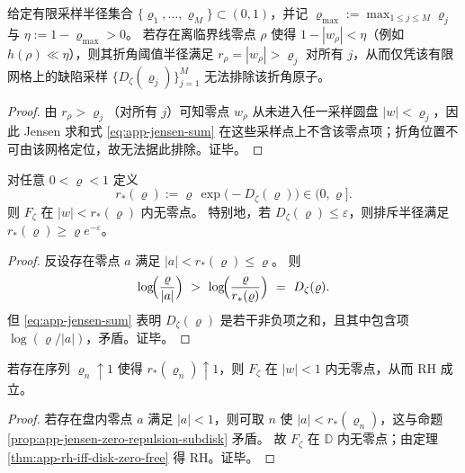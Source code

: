 \begin{corollary}[采样半径截断下的不可检出边界层]\label{cor:app-jensen-kink-undetectable-threshold}
给定有限采样半径集合 \(\{\varrho_1,\dots,\varrho_M\}\subset(0,1)\)，并记
\(
\varrho_{\max}:=\max_{1\le j\le M}\varrho_j
\)
与 \(\eta:=1-\varrho_{\max}>0\)。
若存在离临界线零点 \(\rho\) 使得 \(1-|w_{\rho}|<\eta\)（例如 \(h(\rho)\ll \eta\)），则其折角阈值半径满足 \(r_{\rho}=|w_{\rho}|>\varrho_j\) 对所有 \(j\)，从而仅凭该有限网格上的缺陷采样 \(\{D_{\zeta}(\varrho_j)\}_{j=1}^{M}\) 无法排除该折角原子。
\end{corollary}
\begin{proof}
由 \(r_{\rho}>\varrho_j\)（对所有 \(j\)）可知零点 \(w_{\rho}\) 从未进入任一采样圆盘 \(|w|<\varrho_j\)，因此 Jensen 求和式 \eqref{eq:app-jensen-sum} 在这些采样点上不含该零点项；折角位置不可由该网格定位，故无法据此排除。证毕。
\end{proof}

\begin{proposition}[由缺陷导出的零点排斥子盘]\label{prop:app-jensen-zero-repulsion-subdisk}
对任意 \(0<\varrho<1\) 定义
\[
r_{\ast}(\varrho):=\varrho\,\exp\!\bigl(-D_{\zeta}(\varrho)\bigr)\in(0,\varrho].
\]
则 \(F_{\zeta}\) 在 \(|w|<r_{\ast}(\varrho)\) 内无零点。
特别地，若 \(D_{\zeta}(\varrho)\le \varepsilon\)，则排斥半径满足 \(r_{\ast}(\varrho)\ge \varrho e^{-\varepsilon}\)。
\end{proposition}
\begin{proof}
反设存在零点 \(a\) 满足 \(|a|<r_{\ast}(\varrho)\le \varrho\)。
则
\[
\log\!\Bigl(\frac{\varrho}{|a|}\Bigr)\ >\ \log\!\Bigl(\frac{\varrho}{r_{\ast}(\varrho)}\Bigr)\ =\ D_{\zeta}(\varrho).
\]
但 \eqref{eq:app-jensen-sum} 表明 \(D_{\zeta}(\varrho)\) 是若干非负项之和，且其中包含项 \(\log(\varrho/|a|)\)，矛盾。证毕。
\end{proof}

\begin{corollary}\label{cor:app-jensen-repulsion-radius-to-one}
若存在序列 \(\varrho_n\uparrow 1\) 使得 \(r_{\ast}(\varrho_n)\uparrow 1\)，则 \(F_{\zeta}\) 在 \(|w|<1\) 内无零点，从而 RH 成立。
\end{corollary}
\begin{proof}
若存在盘内零点 \(a\) 满足 \(|a|<1\)，则可取 \(n\) 使 \(|a|<r_{\ast}(\varrho_n)\)，这与命题 \ref{prop:app-jensen-zero-repulsion-subdisk} 矛盾。
故 \(F_{\zeta}\) 在 \(\mathbb{D}\) 内无零点；由定理 \ref{thm:app-rh-iff-disk-zero-free} 得 RH。证毕。
\end{proof}


